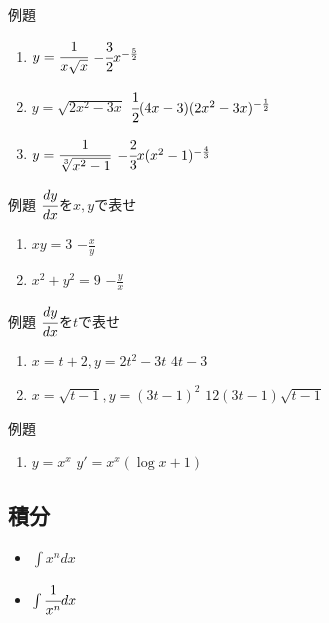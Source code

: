 \documentclass[10pt,dvipdfmx]{jsarticle}
\newcommand{\answer}[2]{{\color{orange}#2}}
\newcommand{\answer}[2]{\vspace{#1mm}}
\begin{document}
\begin{itembox}[l]{例題}
  \begin{large}
    \begin{enumerate}
      \item $y=\cfrac{1}{x\sqrt{x}}$ \answer{0}{$-\cfrac{3}{2}x^{-\frac{5}{2}}$}
      \item $y=\sqrt{2x^2-3x}$ \answer{0}{$\cfrac{1}{2}(4x-3)(2x^2-3x)^{-\frac{1}{2}}$}
      \item $y=\cfrac{1}{\sqrt[3]{x^2-1}}$ \answer{0}{$-\cfrac{2}{3}x(x^2-1)^{-\frac{4}{3}}$}
    \end{enumerate}
  \end{large}
\end{itembox}

\begin{itembox}[l]{例題}
  $\cfrac{dy}{dx}$を$x,y$で表せ
  \begin{large}
    \begin{enumerate}
      \item $xy=3$ \answer{0}{$-\frac{x}{y}$}
      \item $x^2+y^2=9$ \answer{0}{$-\frac{y}{x}$}
    \end{enumerate}
  \end{large}
\end{itembox}

\begin{itembox}[l]{例題}
  $\cfrac{dy}{dx}$を$t$で表せ
  \begin{large}
    \begin{enumerate}
      \item $x=t+2, y=2t^2-3t$ \answer{0}{$4t-3$}
      \item $x=\sqrt{t-1}, y=(3t-1)^2$ \answer{0}{$12(3t-1)\sqrt{t-1}$}
    \end{enumerate}
  \end{large}
\end{itembox}

\begin{itembox}[l]{例題}
  \begin{large}
    \begin{enumerate}
      \item $y=x^x$ \answer{0}{$y'=x^x(\log x+1)$}
    \end{enumerate}
  \end{large}
\end{itembox}


\newpage
\subsection*{積分}
\begin{multicols}{2}
  \begin{Large}
    \begin{itemize}
      \item $\int x^n dx$
      \item $\int \cfrac{1}{x^n} dx$
    \end{itemize}
  \end{Large}
\end{multicols}
\end{document}
